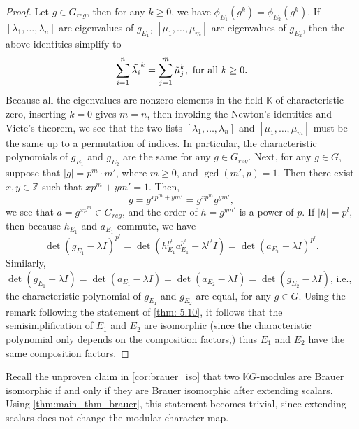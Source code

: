 \documentclass[12pt,a4paper]{report}
\theoremstyle{definition}
\theoremstyle{remark}
\theoremstyle{definition}
\begin{document}
\begin{proof}
    Let $g\in G_{reg}$, then for any $k\geq 0$, we have $\phi_{E_1}(g^k) = \phi_{E_2}(g^k)$. If $[\lambda_1, \ldots, \lambda_n]$ are eigenvalues of $g_{E_1}$, $[\mu_1, \ldots, \mu_m]$ are eigenvalues of $g_{E_2}$, then the above identities simplify to 
    \begin{equation*}
        \sum\limits_{i = 1}^{n}\Tilde{\lambda_i}^{k} = \sum\limits_{j = 1}^{m}\Tilde{\mu}_j^{k}, \text{ for all } k\geq 0. 
    \end{equation*}
    Because all the eigenvalues are nonzero elements in the field $\mathbb{K}$ of characteristic zero, inserting $k=0$ gives $m=n$, then invoking the Newton's identities and Viete's theorem, we see that the two lists $[\lambda_1, \ldots, \lambda_n]$ and $[\mu_1, \ldots, \mu_m]$ must be the same up to a permutation of indices. In particular, the characteristic polynomials of $g_{E_1}$ and $g_{E_2}$ are the same for any $g\in G_{reg}$.\smallbreak
    Next, for any $g\in G$, suppose that $|g| = p^m\cdot m'$, where $m\ge 0$, and $\gcd(m', p) = 1$. Then there exist $x, y\in \mathbb{Z}$ such that $xp^m + ym' =1$. Then,
    \begin{equation*}
        g = g^{xp^m + ym'} = g^{xp^m}g^{ym'}, 
    \end{equation*}
    we see that $a= g^{xp^m}\in G_{reg}$, and the order of $h = g^{ym'}$ is a power of $p$. If $|h| = p^l$, then because $h_{E_1}$ and $a_{E_1}$ commute, we have
    \begin{equation*}
        \det(g_{E_1}-\lambda I)^{p^l} = \det(h_{E_1}^{p^l} a^{p^{l}}_{E_1} - \lambda^{p^l} I) = \det(a_{E_1}-\lambda I)^{p^l}.
    \end{equation*}
    Similarly, $\det(g_{E_1}-\lambda I) = \det(a_{E_1}-\lambda I) = \det(a_{E_2}-\lambda I) = \det(g_{E_2}-\lambda I)$, i.e., the characteristic polynomial of $g_{E_1}$ and $g_{E_2}$ are equal, for any $g\in G$.
    \smallbreak Using the remark following the statement of \cref{thm: 5.10}, it follows that the semisimplification of $E_1$ and $E_2$ are isomorphic (since the characteristic polynomial only depends on the composition factors,) thus $E_1$ and $E_2$ have the same composition factors. 
\end{proof}
Recall the unproven claim in \cref{cor:brauer_iso} that two $\mathbb{K}G$-modules are Brauer isomorphic if and only if they are Brauer isomorphic after extending scalars. Using \cref{thm:main_thm_brauer}, this statement becomes trivial, since extending scalars does not change the modular character map. 
\printindex
\end{document}
